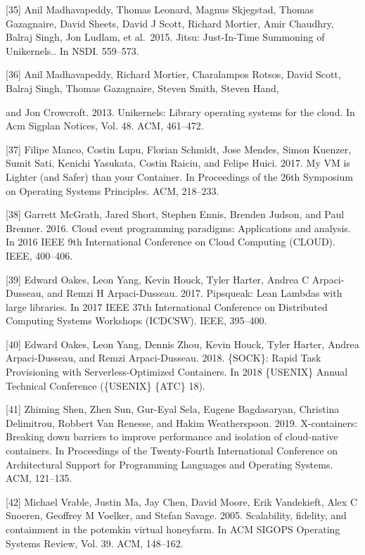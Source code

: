 \documentclass[
  10
]{article}
\begin{document}
{[}35{]} Anil Madhavapeddy, Thomas Leonard, Magnus Skjegstad, Thomas
Gazagnaire, David Sheets, David J Scott, Richard Mortier, Amir Chaudhry,
Balraj Singh, Jon Ludlam, et al.~2015. Jitsu: Just-In-Time Summoning of
Unikernels.. In NSDI. 559--573.

{[}36{]} Anil Madhavapeddy, Richard Mortier, Charalampos Rotsos, David
Scott, Balraj Singh, Thomas Gazagnaire, Steven Smith, Steven Hand,

and Jon Crowcroft. 2013. Unikernels: Library operating systems for the
cloud. In Acm Sigplan Notices, Vol. 48. ACM, 461--472.

{[}37{]} Filipe Manco, Costin Lupu, Florian Schmidt, Jose Mendes, Simon
Kuenzer, Sumit Sati, Kenichi Yasukata, Costin Raiciu, and Felipe Huici.
2017. My VM is Lighter (and Safer) than your Container. In Proceedings
of the 26th Symposium on Operating Systems Principles. ACM, 218--233.

{[}38{]} Garrett McGrath, Jared Short, Stephen Ennis, Brenden Judson,
and Paul Brenner. 2016. Cloud event programming paradigms: Applications
and analysis. In 2016 IEEE 9th International Conference on Cloud
Computing (CLOUD). IEEE, 400--406.

{[}39{]} Edward Oakes, Leon Yang, Kevin Houck, Tyler Harter, Andrea C
Arpaci-Dusseau, and Remzi H Arpaci-Dusseau. 2017. Pipsqueak: Lean
Lambdas with large libraries. In 2017 IEEE 37th International Conference
on Distributed Computing Systems Workshops (ICDCSW). IEEE, 395--400.

{[}40{]} Edward Oakes, Leon Yang, Dennis Zhou, Kevin Houck, Tyler
Harter, Andrea Arpaci-Dusseau, and Remzi Arpaci-Dusseau. 2018. \{SOCK\}:
Rapid Task Provisioning with Serverless-Optimized Containers. In 2018
\{USENIX\} Annual Technical Conference (\{USENIX\} \{ATC\} 18).

{[}41{]} Zhiming Shen, Zhen Sun, Gur-Eyal Sela, Eugene Bagdasaryan,
Christina Delimitrou, Robbert Van Renesse, and Hakim Weatherspoon. 2019.
X-containers: Breaking down barriers to improve performance and
isolation of cloud-native containers. In Proceedings of the
Twenty-Fourth International Conference on Architectural Support for
Programming Languages and Operating Systems. ACM, 121--135.

{[}42{]} Michael Vrable, Justin Ma, Jay Chen, David Moore, Erik
Vandekieft, Alex C Snoeren, Geoffrey M Voelker, and Stefan Savage. 2005.
Scalability, fidelity, and containment in the potemkin virtual
honeyfarm. In ACM SIGOPS Operating Systems Review, Vol. 39. ACM,
148--162.
\end{document}
